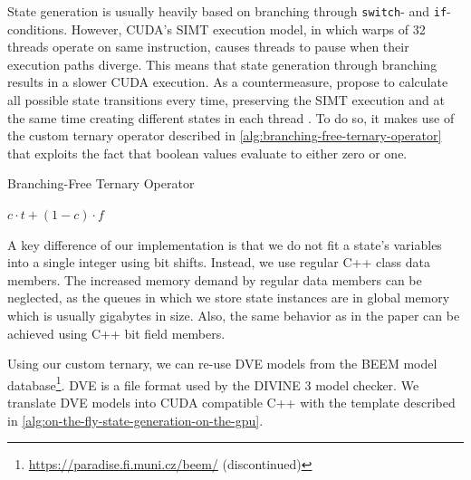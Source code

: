 \documentclass[
fancyheadings, %
%
%
]{stsreprt}
\DeclareMathOperator{\branchFreeTernary}{\texttt{BranchFreeTernary}}
\begin{document}
State generation is usually heavily based on branching through \texttt{switch}- and \texttt{if}-conditions.
However, CUDA's SIMT execution model, in which warps of 32 threads operate on same instruction, causes threads to pause when their execution paths diverge.
This means that state generation through branching results in a slower CUDA execution.
As a countermeasure, \citeauthor*{Bartocci2014.GPGPU-Parallel-SPIN} propose to calculate all possible state transitions every time, preserving the SIMT execution and at the same time creating different states in each thread \cite[Algorithm 3]{Bartocci2014.GPGPU-Parallel-SPIN}.
To do so, it makes use of the custom ternary operator described in \cref{alg:branching-free-ternary-operator} that exploits the fact that boolean values evaluate to either zero or one.

\begin{algorithm}
    \caption{Branching-Free Ternary Operator}
    \label{alg:branching-free-ternary-operator}
    \begin{algorithmic}
        \Function{$\branchFreeTernary$}{bool c, int t, int f}
        \State \Return $c \cdot t + (1 - c) \cdot f$
        \EndFunction
    \end{algorithmic}
\end{algorithm}

A key difference of our implementation is that we do not fit a state's variables into a single integer using bit shifts.
Instead, we use regular C++ class data members.
The increased memory demand by regular data members can be neglected, as the queues in which we store state instances are in global memory which is usually gigabytes in size.
Also, the same behavior as in the paper can be achieved using C++ bit field members.

Using our custom ternary, we can re-use DVE models from the BEEM model database\footnote{\url{https://paradise.fi.muni.cz/beem/} (discontinued)}.
DVE is a file format used by the DIVINE 3 model checker.
We translate DVE models into CUDA compatible C++ with the template described in \cref{alg:on-the-fly-state-generation-on-the-gpu}.

\end{document}
